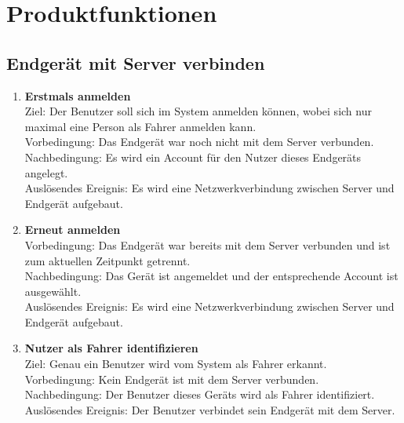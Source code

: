 \documentclass[pflichtenheft.tex]{subfiles}
\begin{document}
\chapter{Produktfunktionen}

\renewcommand{\theenumi}{/FA\ifnum \value{enumi}<10 0\fi\arabic{enumi}0/}
\renewcommand{\labelenumi}{\theenumi}
\renewcommand{\theenumii}{\arabic{enumii}}
\renewcommand{\labelenumii}{/FA\ifnum \value{enumi}<10 0\fi\arabic{enumi}\arabic{enumii}/}

\section{Endgerät mit Server verbinden}

	\begin{enumerate}
		\item{\textbf{Erstmals anmelden}} \label{firstcon}
		\\ Ziel: Der Benutzer soll sich im System anmelden können, wobei sich nur maximal eine Person als Fahrer anmelden kann. \\
		Vorbedingung: Das Endgerät war noch nicht mit dem Server verbunden.\\
		Nachbedingung: Es wird ein Account für den Nutzer dieses Endgeräts angelegt.\\
		Auslösendes Ereignis: Es wird eine Netzwerkverbindung zwischen Server und Endgerät aufgebaut.

		\item{\textbf{Erneut anmelden}} \label{connection}
		\\Vorbedingung: Das Endgerät war bereits mit dem Server verbunden und ist zum aktuellen Zeitpunkt getrennt. \\
		Nachbedingung: Das Gerät ist angemeldet und der entsprechende Account ist ausgewählt.\\
		Auslösendes Ereignis: Es wird eine Netzwerkverbindung zwischen Server und Endgerät aufgebaut.

		\item{\textbf{Nutzer als Fahrer identifizieren}} \label{driver1}
		\\ Ziel: Genau ein Benutzer wird vom System als Fahrer erkannt.\\
		Vorbedingung: Kein Endgerät ist mit dem Server verbunden.\\
		Nachbedingung: Der Benutzer dieses Geräts wird als Fahrer identifiziert. \\
		Auslösendes Ereignis: Der Benutzer verbindet sein Endgerät mit dem Server.


\end{enumerate}
\end{document}
